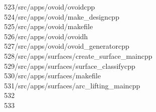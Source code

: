 \begin{tabbing}
523\>/src/apps/ovoid/ovoidcpp\\[0pt]
524\>/src/apps/ovoid/make\_designcpp\\[0pt]
525\>/src/apps/ovoid/makefile\\[0pt]
526\>/src/apps/ovoid/ovoidh\\[0pt]
527\>/src/apps/ovoid/ovoid\_generatorcpp\\[0pt]
528\>/src/apps/surfaces/create\_surface\_maincpp\\[0pt]
529\>/src/apps/surfaces/surface\_classifycpp\\[0pt]
530\>/src/apps/surfaces/makefile\\[0pt]
531\>/src/apps/surfaces/arc\_lifting\_maincpp\\[0pt]
532\>\\[0pt]
533\>\end{tabbing}
